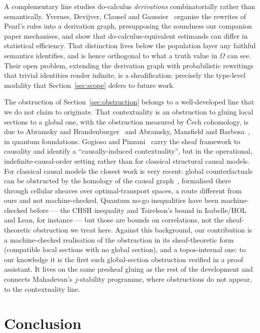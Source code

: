 \documentclass{lmcs}
\newcommand{\Om}{\Omega}
\begin{document}
A complementary line studies do-calculus \emph{derivations} combinatorially rather than semantically. Yvernes, Devijver, Clausel and Gaussier~\cite{yvernes-et-al-2026} organise the rewrites of Pearl's rules into a derivation graph, presupposing the soundness our companion paper mechanises, and show that do-calculus-equivalent estimands can differ in statistical efficiency. That distinction lives below the population layer any faithful semantics identifies, and is hence orthogonal to what a truth value in $\Om$ can see. Their open problem, extending the derivation graph with probabilistic rewritings that trivial identities render infinite, is a sheafification: precisely the type-level modality that Section~\ref{sec:scope} defers to future work.

The obstruction of Section~\ref{sec:obstruction} belongs to a well-developed line that we do not claim to originate.
That contextuality is an obstruction to gluing local sections to a global one, with the obstruction measured by \v{C}ech cohomology, is due to Abramsky and Brandenburger~\cite{abramsky-brandenburger-2011} and Abramsky, Mansfield and Barbosa~\cite{abramsky-mansfield-barbosa-2012}, in quantum foundations.
Gogioso and Pinzani~\cite{gogioso-pinzani-2023} carry the sheaf framework to causality and identify a ``causally-induced contextuality'', but in the operational, indefinite-causal-order setting rather than for classical structural causal models.
For classical causal models the closest work is very recent: global counterfactuals can be obstructed by the homology of the causal graph~\cite{causal-counterfactual-obstructions-2026}, formalised there through cellular sheaves over optimal-transport spaces, a route different from ours and not machine-checked.
Quantum no-go inequalities have been machine-checked before --- the CHSH inequality and Tsirelson's bound in Isabelle/HOL and Lean, for instance --- but those are bounds on correlations, not the sheaf-theoretic obstruction we treat here.
Against this background, our contribution is a machine-checked realisation of the obstruction in its sheaf-theoretic form (compatible local sections with no global section), and a topos-internal one: to our knowledge it is the first such global-section obstruction verified in a proof assistant.
It lives on the same presheaf gluing as the rest of the development and connects Mahadevan's $j$-stability programme, where obstructions do not appear, to the contextuality line.

\section{Conclusion}\label{sec:conclusion}
\end{document}

